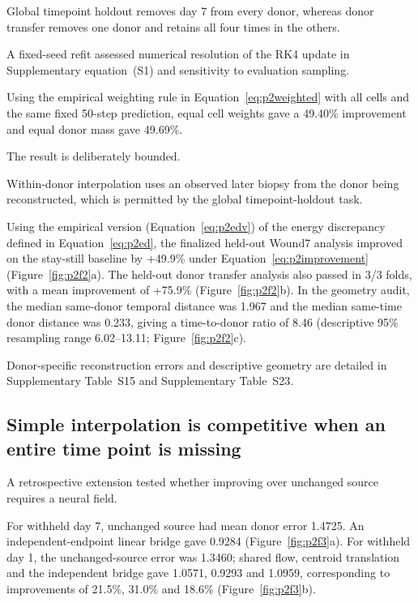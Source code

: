 \documentclass[10pt,a4paper]{article}
\begin{document}
Global timepoint holdout removes day 7 from every donor, whereas donor transfer removes one donor and retains all four times in the others.

A fixed-seed refit assessed numerical resolution of the RK4 update in Supplementary equation~(S1) and sensitivity to evaluation sampling.

Using the empirical weighting rule in Equation~\eqref{eq:p2weighted} with all cells and the same fixed 50-step prediction, equal cell weights gave a 49.40\% improvement and equal donor mass gave 49.69\%.

The result is deliberately bounded.

Within-donor interpolation uses an observed later biopsy from the donor being reconstructed, which is permitted by the global timepoint-holdout task.

\FloatBarrier
Using the empirical version (Equation~\eqref{eq:p2edv}) of the energy discrepancy defined in Equation~\eqref{eq:p2ed}, the finalized held-out Wound7 analysis improved on the stay-still baseline by +49.9\% under Equation~\eqref{eq:p2improvement} (Figure~\ref{fig:p2f2}a\label{call:p2f2}). The held-out donor transfer analysis also passed in 3/3 folds, with a mean improvement of +75.9\% (Figure~\ref{fig:p2f2}b). In the geometry audit, the median same-donor temporal distance was 1.967 and the median same-time donor distance was 0.233, giving a time-to-donor ratio of 8.46 (descriptive 95\% resampling range 6.02--13.11; Figure~\ref{fig:p2f2}c).



Donor-specific reconstruction errors and descriptive geometry are detailed in Supplementary Table~S15 and Supplementary Table~S23.

\subsection{Simple interpolation is competitive when an entire time point is missing}

A retrospective extension tested whether improving over unchanged source requires a neural field.

For withheld day 7, unchanged source had mean donor error 1.4725. An independent-endpoint linear bridge gave 0.9284 (Figure~\ref{fig:p2f3}a\label{call:p2f3}). For withheld day 1, the unchanged-source error was 1.3460; shared flow, centroid translation and the independent bridge gave 1.0571, 0.9293 and 1.0959, corresponding to improvements of 21.5\%, 31.0\% and 18.6\% (Figure~\ref{fig:p2f3}b).
\end{document}
